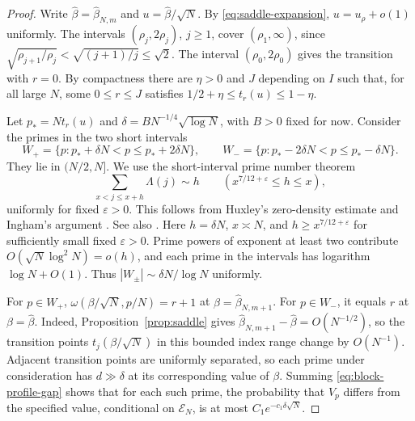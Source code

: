\documentclass[11pt]{amsart}
\theoremstyle{remark}
\begin{document}
\begin{proof}
Write \(\widehat\beta=\widehat\beta_{N,m}\) and
\(u=\widehat\beta/\sqrt N\). By \eqref{eq:saddle-expansion},
\(u=u_\rho+o(1)\) uniformly.
The intervals \((\rho_j,2\rho_j)\), \(j\ge 1\), cover
\((\rho_1,\infty)\), since
\(\sqrt{\rho_{j+1}/\rho_j}<\sqrt{(j+1)/j}\le\sqrt2\).
The interval \((\rho_0,2\rho_0)\) gives the transition with \(r=0\).
By compactness there are \(\eta>0\) and \(J\) depending on \(I\) such
that, for all large \(N\), some \(0\le r\le J\) satisfies
\(1/2+\eta\le t_r(u)\le 1-\eta\).

Let \(p_* = Nt_r(u)\) and
\(\delta=B N^{-1/4}\sqrt{\log N}\), with \(B>0\) fixed for now.
Consider the primes in the two short intervals
\[
 W_+ = \{p:p_*+\delta N<p\le p_*+2\delta N\},\qquad
 W_- = \{p:p_*-2\delta N<p\le p_*-\delta N\}.
\]
They lie in \((N/2,N]\). We use the short-interval prime number theorem
\[
 \sum_{x<j\le x+h}\Lambda(j)\sim h
 \qquad (x^{7/12+\varepsilon}\le h\le x),
\]
uniformly for fixed \(\varepsilon>0\). This follows from Huxley's
zero-density estimate \cite[Section~1]{huxley} and Ingham's argument
\cite[Theorem~1]{ingham}. See also \cite[(1.1)]{matomaki-teravainen}.
Here \(h=\delta N\), \(x\asymp N\), and \(h\ge x^{7/12+\varepsilon}\)
for sufficiently small fixed \(\varepsilon>0\). Prime powers of exponent
at least two contribute \(O(\sqrt N\log^2 N)=o(h)\), and each prime in
the intervals has logarithm \(\log N+O(1)\). Thus
\(|W_\pm|\sim\delta N/\log N\) uniformly.

For \(p\in W_+\), \(\omega(\beta/\sqrt N,p/N)=r+1\) at
\(\beta=\widehat\beta_{N,m+1}\). For \(p\in W_-\), it equals \(r\) at
\(\beta=\widehat\beta\). Indeed, Proposition~\ref{prop:saddle} gives
\(\widehat\beta_{N,m+1}-\widehat\beta=O(N^{-1/2})\), so the transition
points \(t_j(\beta/\sqrt N)\) in this bounded index range change by
\(O(N^{-1})\). Adjacent transition points are uniformly separated, so
each prime under consideration has \(d\gg\delta\) at its corresponding
value of \(\beta\). Summing \eqref{eq:block-profile-gap} shows that for
each such prime, the probability that \(V_p\) differs from the specified
value, conditional on \(\mathcal E_N\), is at most \(C_1e^{-c_1\delta\sqrt N}\).


\end{proof}
\end{document}
